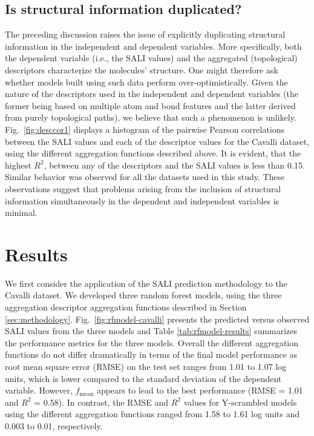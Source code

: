 \documentclass[letterpaper, 12pt]{article}
\begin{document}
\subsection{Is structural information duplicated?}
\label{sec:are-we-duplicating}

The preceding discussion raises the issue of explicitly duplicating structural information in the
independent and dependent variables. More specifically, both the dependent variable (i.e., the SALI
values) and the aggregated (topological) descriptors characterize the molecules' structure. One
might therefore ask whether models built using such data perform over-optimistically. Given the
nature of the descriptors used in the independent and dependent variables (the former being based on
multiple atom and bond features and the latter derived from purely topological paths), we believe
that such a phenomenon is unlikely.  Fig.~\ref{fig:desccor1} displays a histogram of the pairwise
Pearson correlations between the SALI values and each of the descriptor values for the
Cavalli\cite{Cavalli:2002aa} dataset, using the different aggregation functions described above. It
is evident, that the highest $R^2$, between any of the descriptors and the SALI values is less than
0.15. Similar behavior was observed for all the datasets used in this study. These observations
suggest that problems arising from the inclusion of structural information simultaneously in the
dependent and independent variables is minimal.

\section{Results}
\label{sec:applications}
We first consider the application of the SALI prediction methodology to the Cavalli dataset. We
developed three random forest models, using the three aggregation descriptor aggregation functions
described in Section \ref{sec:methodology}. Fig.~\ref{fig:rfmodel-cavalli} presents the predicted
versus observed SALI values from the three models and Table \ref{tab:rfmodel-results} summarizes the
performance metrics for the three models. Overall the different aggregation functions do not differ
dramatically in terms of the final model performance as root mean square error (RMSE) on the test
set ranges from 1.01 to 1.07 log units, which is lower compared to the standard deviation of the
dependent variable. However, $f_{\textrm{mean}}$ appears to lead to the best performance (RMSE =
1.01 and $R^2$ = 0.58). In contrast, the RMSE and $R^2$ values for Y-scrambled\cite{Rucker:2007aa}
models using the different aggregation functions ranged from 1.58 to 1.61 log units and 0.003 to
0.01, respectively.
\end{document}

